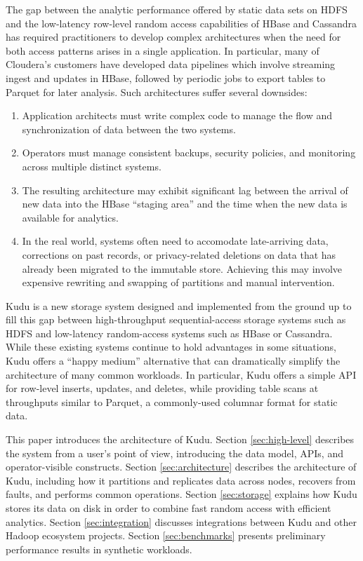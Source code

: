 \documentclass[twocolumn,9pt]{article}
\begin{document}
The gap between the analytic performance offered by static data sets on HDFS and the
low-latency row-level random access capabilities of HBase and Cassandra has required
practitioners to develop complex architectures when the need for both access patterns
arises in a single application. In particular, many of Cloudera's customers
have developed data pipelines which involve streaming ingest and updates in HBase, followed
by periodic jobs to export tables to Parquet for later analysis. Such architectures
suffer several downsides:

\begin{enumerate}
\item Application architects must write complex code to manage the
  flow and synchronization of data between the two systems.
\item Operators must manage consistent backups, security policies,
  and monitoring across multiple distinct systems.
\item The resulting architecture may exhibit significant lag between the arrival
  of new data into the HBase ``staging area'' and the time when the new data
  is available for analytics.
\item In the real world, systems often need to accomodate late-arriving data, corrections
  on past records, or privacy-related deletions on data that has already been
  migrated to the immutable store. Achieving this may involve expensive rewriting
  and swapping of partitions and manual intervention.
\end{enumerate}

Kudu is a new storage system designed and implemented from the ground up to fill this gap between
high-throughput sequential-access storage systems such as HDFS\cite{hdfs} and low-latency random-access
systems such as HBase or Cassandra. While these existing systems continue to hold advantages in some
situations, Kudu offers a ``happy medium'' alternative that can dramatically simplify the
architecture of many common workloads. In particular, Kudu offers a simple API for row-level
inserts, updates, and deletes, while providing table scans at throughputs similar to Parquet,
a commonly-used columnar format for static data.

This paper introduces the architecture of Kudu. Section \ref{sec:high-level} describes the system
from a user's point of view, introducing the data model, APIs, and operator-visible constructs.
Section \ref{sec:architecture} describes the architecture of Kudu, including how it partitions and
replicates data across nodes, recovers from faults, and performs common operations.  Section
\ref{sec:storage} explains how Kudu stores its data on disk in order to combine fast random
access with efficient analytics. Section \ref{sec:integration} discusses integrations between Kudu
and other Hadoop ecosystem projects. Section \ref{sec:benchmarks} presents preliminary performance
results in synthetic workloads.
\end{document}

